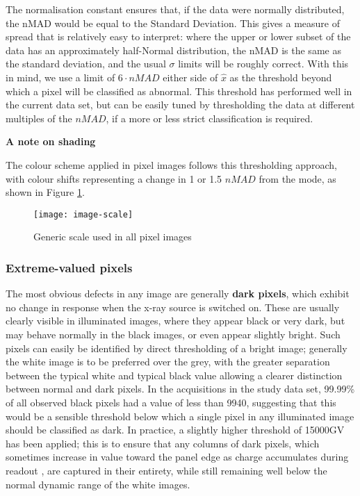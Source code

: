 \documentclass[\main/IO-Pixels.tex]{subfiles}
\begin{document}
The normalisation constant ensures that, if the data were normally distributed, the nMAD would be equal to the Standard Deviation. This gives a measure of spread that is relatively easy to interpret: where the upper or lower subset of the data has an approximately half-Normal distribution, the nMAD is the same as the standard deviation, and the usual $\sigma$ limits will be roughly correct. With this in mind, we use a limit of $6 \cdot nMAD$ either side of $\hat{x}$ as the threshold beyond which a pixel will be classified as abnormal. This threshold has performed well in the current data set, but can be easily tuned by thresholding the data at different multiples of the $nMAD$, if a more or less strict classification is required.

\textbf{A note on shading}

The colour scheme applied in pixel images follows this thresholding approach, with colour shifts representing a change in 1 or 1.5 $nMAD$ from the mode, as shown in Figure \ref{fig:scale-bar}.

\begin{figure}[!ht]
    \caption{Generic scale used in all pixel images}
    \label{fig:scale-bar}

    \centering
    \texttt{[image: image-scale]}
\end{figure}


\subsubsection{Extreme-valued pixels}

The most obvious defects in any image are generally \textbf{dark pixels}, which exhibit no change in response when the x-ray source is switched on. These are usually clearly visible in illuminated images, where they appear black or very dark, but may behave normally in the black images, or even appear slightly bright. Such pixels can easily be identified by direct thresholding of a bright image; generally the white image is to be preferred over the grey, with the greater separation between the typical white and typical black value allowing a clearer distinction between normal and dark pixels. In the acquisitions in the study data set, 99.99\% of all observed black pixels had a value of less than 9940, suggesting that this would be a sensible threshold below which a single pixel in any illuminated image should be classified as dark. In practice, a slightly higher threshold of 15000GV has been applied; this is to ensure that any columns of dark pixels, which sometimes increase in value toward the panel edge as charge accumulates during readout , are captured in their entirety, while still remaining well below the normal dynamic range of the white images.
\end{document}

